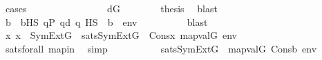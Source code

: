 \begin{isabellebody}
\ {\isacharparenleft}{\kern0pt}cases{\isacharparenright}{\kern0pt}\isanewline
\ \ \ \ \ \ \isamarkupfalse%
\ {}\isanewline
\ \ \ \ \ \ \isamarkupfalse%
\ {\isacartoucheopen}d{\isasymin}G{\isacartoucheclose}\isanewline
\ \ \ \ \ \ \isamarkupfalse%
\ {\isacharquery}{\kern0pt}thesis\ \isamarkupfalse%
\ blast\isanewline
\ \ \ \ \isamarkupfalse%
\isanewline
\ \ \ \ \ \ \isamarkupfalse%
\ {}\isanewline
\ \ \ \ \ \ \isamarkupfalse%
\isanewline
\ \ \ \ \ \ \isamarkupfalse%
\ b\ \ {\isachardoublequoteopen}b{\isasymin}HS{\isachardoublequoteclose}\ {\isachardoublequoteopen}{\isasymforall}q{\isasymin}P{\isachardot}{\kern0pt}\ q{\isasympreceq}d\ {\isasymlongrightarrow}{\isasymnot}{\isacharparenleft}{\kern0pt}q\ {\isasymtturnstile}HS\ {\isasymphi}\ {\isacharparenleft}{\kern0pt}{\isacharbrackleft}{\kern0pt}b{\isacharbrackright}{\kern0pt}\ {\isacharat}{\kern0pt}\ env{\isacharparenright}{\kern0pt}{\isacharparenright}{\kern0pt}{\isachardoublequoteclose}\isanewline
\ \ \ \ \ \ \ \ \isamarkupfalse%
\ blast\isanewline
\ \ \ \ \ \ \isamarkupfalse%
\ \isanewline
\isanewline
\ \ \ \ \ \ \isamarkupfalse%
\ {\isachardoublequoteopen}{\isasymAnd}x{\isachardot}{\kern0pt}\ x\ {\isasymin}\ SymExt{\isacharparenleft}{\kern0pt}G{\isacharparenright}{\kern0pt}\ {\isasymLongrightarrow}\ sats{\isacharparenleft}{\kern0pt}SymExt{\isacharparenleft}{\kern0pt}G{\isacharparenright}{\kern0pt}{\isacharcomma}{\kern0pt}\ {\isasymphi}{\isacharcomma}{\kern0pt}\ Cons{\isacharparenleft}{\kern0pt}x{\isacharcomma}{\kern0pt}\ map{\isacharparenleft}{\kern0pt}val{\isacharparenleft}{\kern0pt}G{\isacharparenright}{\kern0pt}{\isacharcomma}{\kern0pt}\ env{\isacharparenright}{\kern0pt}{\isacharparenright}{\kern0pt}{\isacharparenright}{\kern0pt}{\isachardoublequoteclose}\ \isanewline
\ \ \ \ \ \ \ \ \isamarkupfalse%
\ satsforall\ mapin\ \isamarkupfalse%
\ simp\ \isanewline
\ \ \ \ \ \ \isamarkupfalse%
\ \isamarkupfalse%
\ {\isachardoublequoteopen}sats{\isacharparenleft}{\kern0pt}SymExt{\isacharparenleft}{\kern0pt}G{\isacharparenright}{\kern0pt}{\isacharcomma}{\kern0pt}\ {\isasymphi}{\isacharcomma}{\kern0pt}\ map{\isacharparenleft}{\kern0pt}val{\isacharparenleft}{\kern0pt}G{\isacharparenright}{\kern0pt}{\isacharcomma}{\kern0pt}\ Cons{\isacharparenleft}{\kern0pt}b{\isacharcomma}{\kern0pt}\ env{\isacharparenright}{\kern0pt}{\isacharparenright}{\kern0pt}{\isacharparenright}{\kern0pt}{\isachardoublequoteclose}\ \isanewline

\end{isabellebody}

